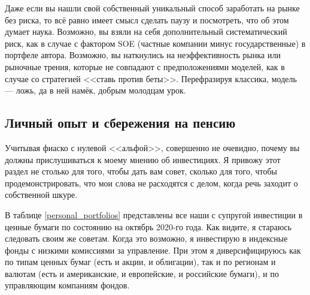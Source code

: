 Даже если вы нашли свой собственный уникальный способ заработать на рынке без
риска, то всё равно имеет смысл сделать паузу и посмотреть, что об этом думает
наука. Возможно, вы взяли на себя дополнительный систематический риск, как в
случае с фактором SOE (частные компании минус государственные) в портфеле 
автора. Возможно, вы наткнулись на неэффективность рынка или рыночные трения, 
которые не совпадают с предположениями моделей, как в случае со стратегией 
<<ставь против беты>>. Перефразируя классика, модель --- ложь, да в ней намёк, 
добрым молодцам урок.

\subsection{Личный опыт и сбережения на пенсию}

Учитывая фиаско с нулевой <<альфой>>, совершенно не очевидно, почему вы должны
прислушиваться к моему мнению об инвестициях. Я привожу этот раздел не столько
для того, чтобы дать вам совет, сколько для того, чтобы продемонстрировать, что
мои слова не расходятся с делом, когда речь заходит о собственной шкуре.

В таблице \ref{personal_portfolios} представлены все наши с супругой инвестиции
в ценные бумаги по состоянию на октябрь 2020-го года. Как видите, я стараюсь
следовать своим же советам. Когда это возможно, я инвестирую в индексные фонды 
с низкими комиссиями за управление. При этом я диверсифицируюсь как по типам
ценных бумаг (есть и акции, и облигации), так и по регионам и валютам (есть и
американские, и европейские, и российские бумаги), и по управляющим компаниям фондов.

